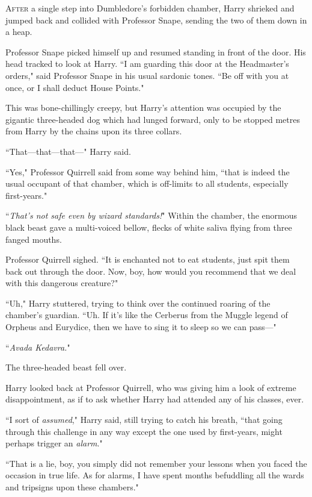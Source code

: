 
\lettrine{A}{fter} a single step into Dumbledore's forbidden chamber, Harry shrieked and jumped back and collided with Professor Snape, sending the two of them down in a heap.

Professor Snape picked himself up and resumed standing in front of the door. His head tracked to look at Harry. ``I am guarding this door at the Headmaster's orders," said Professor Snape in his usual sardonic tones. ``Be off with you at once, or I shall deduct House Points."

This was bone-chillingly creepy, but Harry's attention was occupied by the gigantic three-headed dog which had lunged forward, only to be stopped metres from Harry by the chains upon its three collars.

``That—that—that—" Harry said.

``Yes," Professor Quirrell said from some way behind him, ``that is indeed the usual occupant of that chamber, which is off-limits to all students, especially first-years."

``\emph{That's not safe even by wizard standards!}" Within the chamber, the enormous black beast gave a multi-voiced bellow, flecks of white saliva flying from three fanged mouths.

Professor Quirrell sighed. ``It is enchanted not to eat students, just spit them back out through the door. Now, boy, how would you recommend that we deal with this dangerous creature?"

``Uh," Harry stuttered, trying to think over the continued roaring of the chamber's guardian. ``Uh. If it's like the Cerberus from the Muggle legend of Orpheus and Eurydice, then we have to sing it to sleep so we can pass—"

``\emph{Avada Kedavra.}"

The three-headed beast fell over.

Harry looked back at Professor Quirrell, who was giving him a look of extreme disappointment, as if to ask whether Harry had attended any of his classes, ever.

``I sort of \emph{assumed}," Harry said, still trying to catch his breath, ``that going through this challenge in any way except the one used by first-years, might perhaps trigger an \emph{alarm}."

``That is a lie, boy, you simply did not remember your lessons when you faced the occasion in true life. As for alarms, I have spent months befuddling all the wards and tripsigns upon these chambers."

